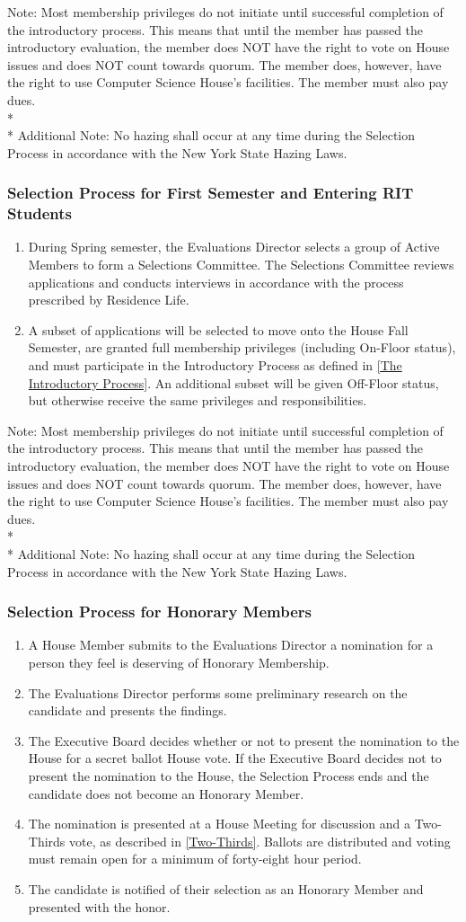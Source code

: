 \documentclass{article}
\newcommand{\bsubsection}[1]{\subsubsection{#1} \label{#1}}
\begin{document}
Note: Most membership privileges do not initiate until successful completion of the introductory process. This means that until the member has passed the introductory evaluation, the member does NOT have the right to vote on House issues and does NOT count towards quorum. The member does, however, have the right to use Computer Science House's facilities. The member must also pay dues.
\\* \\*
Additional Note: No hazing shall occur at any time during the Selection Process in accordance with the New York State Hazing Laws.
\bsubsection{Selection Process for First Semester and Entering RIT Students}
\begin{enumerate}
	\item During Spring semester, the Evaluations Director selects a group of Active Members to form a Selections Committee. The Selections Committee reviews applications and conducts interviews in accordance with the process prescribed by Residence Life.
	\item A subset of applications will be selected to move onto the House Fall Semester, are granted full membership privileges (including On-Floor status), and must participate in the Introductory Process as defined in \ref{The Introductory Process}. An additional subset will be given Off-Floor status, but otherwise receive the same privileges and responsibilities.
\end{enumerate}
Note: Most membership privileges do not initiate until successful completion of the introductory process. This means that until the member has passed the introductory evaluation, the member does NOT have the right to vote on House issues and does NOT count towards quorum. The member does, however, have the right to use Computer Science House's facilities. The member must also pay dues.
\\* \\*
Additional Note: No hazing shall occur at any time during the Selection Process in accordance with the New York State Hazing Laws.
\bsubsection{Selection Process for Honorary Members}
\begin{enumerate}
	\item A House Member submits to the Evaluations Director a nomination for a person they feel is deserving of Honorary Membership.
	\item The Evaluations Director performs some preliminary research on the candidate and presents the findings.
	\item The Executive Board decides whether or not to present the nomination to the House for a secret ballot House vote. If the Executive Board decides not to present the nomination to the House, the Selection Process ends and the candidate does not become an Honorary Member.
	\item The nomination is presented at a House Meeting for discussion and a Two-Thirds vote, as described in \ref{Two-Thirds}. Ballots are distributed and voting must remain open for a minimum of forty-eight hour period.
	\item The candidate is notified of their selection as an Honorary Member and presented with the honor.
\end{enumerate}
\end{document}
